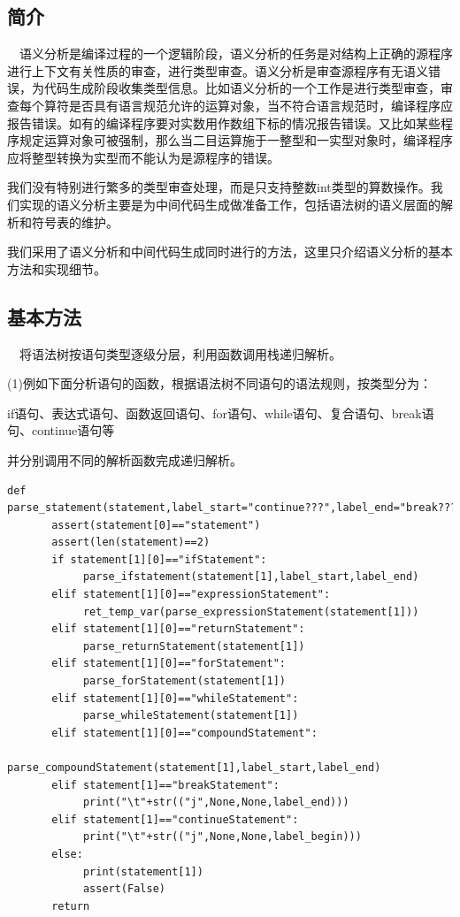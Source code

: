 \documentclass{article}
\begin{document}
\subsection{简介}

\quad\ \ 语义分析是编译过程的一个逻辑阶段，语义分析的任务是对结构上正确的源程序进行上下文有关性质的审查，进行类型审查。语义分析是审查源程序有无语义错误，为代码生成阶段收集类型信息。比如语义分析的一个工作是进行类型审查，审查每个算符是否具有语言规范允许的运算对象，当不符合语言规范时，编译程序应报告错误。如有的编译程序要对实数用作数组下标的情况报告错误。又比如某些程序规定运算对象可被强制，那么当二目运算施于一整型和一实型对象时，编译程序应将整型转换为实型而不能认为是源程序的错误。


我们没有特别进行繁多的类型审查处理，而是只支持整数int类型的算数操作。我们实现的语义分析主要是为中间代码生成做准备工作，包括语法树的语义层面的解析和符号表的维护。


我们采用了语义分析和中间代码生成同时进行的方法，这里只介绍语义分析的基本方法和实现细节。

\subsection{基本方法}

\quad\ \ 将语法树按语句类型逐级分层，利用函数调用栈递归解析。

(1)例如下面分析语句的函数，根据语法树不同语句的语法规则，按类型分为：

if语句、表达式语句、函数返回语句、for语句、while语句、复合语句、break语句、continue语句等

并分别调用不同的解析函数完成递归解析。

\begin{verbatim}
def parse_statement(statement,label_start="continue???",label_end="break???"):
       assert(statement[0]=="statement")
       assert(len(statement)==2)
       if statement[1][0]=="ifStatement":
            parse_ifstatement(statement[1],label_start,label_end)
       elif statement[1][0]=="expressionStatement":
            ret_temp_var(parse_expressionStatement(statement[1]))
       elif statement[1][0]=="returnStatement":
            parse_returnStatement(statement[1])
       elif statement[1][0]=="forStatement":
            parse_forStatement(statement[1])
       elif statement[1][0]=="whileStatement":
            parse_whileStatement(statement[1])
       elif statement[1][0]=="compoundStatement":
            parse_compoundStatement(statement[1],label_start,label_end)
       elif statement[1]=="breakStatement":
            print("\t"+str(("j",None,None,label_end)))
       elif statement[1]=="continueStatement":
            print("\t"+str(("j",None,None,label_begin)))
       else:
            print(statement[1])
            assert(False)
       return
\end{verbatim}
\end{document}
